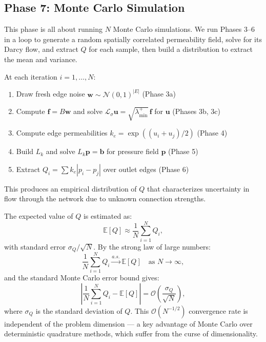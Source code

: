 \documentclass[a4paper,12pt]{amsart}
\numberwithin{equation}{section}
\def\bw{{\mathbf w}}
\def\bb{{\mathbf b}}
\def\bp{{\mathbf p}}
\def\bbf{{\mathbf f}}
\renewcommand{\L}{{\mathcal L}}
\begin{document}
\subsection{Phase 7: Monte Carlo Simulation}

This phase is all about running $N$ Monte Carlo simulations. We run 
Phases 3--6 in a loop to generate a random spatially correlated 
permeability field, solve for its Darcy flow, and extract $Q$ for 
each sample, then build a distribution to extract the mean and variance.

At each iteration $i = 1, \dots, N$:
\begin{enumerate}[noitemsep, topsep=4pt, leftmargin=3em]
    \item Draw fresh edge noise $\bw \sim \mathcal{N}(0,1)^{|E|}$ 
    (Phase 3a)
    \item Compute $\bbf = B\bw$ and solve $\L_\sigma \mathbf{u} = 
    \sqrt{\lambda^+_{\min}}\,\mathbf{f}$ for $\mathbf{u}$ (Phases 3b, 3c)
    \item Compute edge permeabilities $k_e = \exp((u_i + u_j)/2)$ 
    (Phase 4)
    \item Build $L_k$ and solve $L_k\bp = \bb$ for pressure field 
    $\bp$ (Phase 5)
    \item Extract $Q_i = \sum k_e|p_i - p_j|$ over outlet edges 
    (Phase 6)
\end{enumerate}
This produces an empirical distribution of $Q$ that characterizes 
uncertainty in flow through the network due to unknown connection 
strengths.

The expected value of $Q$ is estimated as:
\begin{equation}
\mathbb{E}[Q] \approx \frac{1}{N} \sum_{i=1}^{N} Q_i,
\end{equation}
with standard error $\sigma_Q / \sqrt{N}$. By the strong law of 
large numbers:
\begin{equation}
\frac{1}{N} \sum_{i=1}^{N} Q_i \xrightarrow{a.s.} \mathbb{E}[Q] 
\quad \text{as } N \to \infty,
\end{equation}
and the standard Monte Carlo error bound gives:
\begin{equation}
\left| \frac{1}{N} \sum_{i=1}^{N} Q_i - \mathbb{E}[Q] \right| = 
\mathcal{O}\!\left(\frac{\sigma_Q}{\sqrt{N}}\right),
\end{equation}
where $\sigma_Q$ is the standard deviation of $Q$. This 
$\mathcal{O}(N^{-1/2})$ convergence rate is independent of the 
problem dimension — a key advantage of Monte Carlo over deterministic 
quadrature methods, which suffer from the curse of dimensionality.
\end{document}
